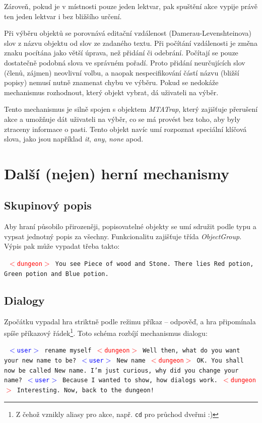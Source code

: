 \documentclass[11pt, a4paper]{article}
\def\class#1{\emph{#1}}
\newenvironment{example}%
{\smallskip\noindent\ignorespaces\obeylines\tt}%
{\smallskip\par\noindent
\ignorespacesafterend}
\def\user{\textcolor{blue}{$<$user$>$ }}
\def\dung{\textcolor{red}{$<$dungeon$>$ }}
\begin{document}
Zároveň, pokud je v místnosti pouze jeden lektvar, pak spuštění akce vypije právě ten jeden lektvar i bez bližšího určení.

Při výběru objektů se porovnává editační vzdálenost (Damerau-Levenshteinova) slov z názvu objektu od slov ze zadaného textu. Při počítání vzdálenosti je změna znaku pocítána jako větší úprava, než přidání či odebrání. Počítají se pouze dostatečně podobná slova ve správném pořadí. Proto přidání neurčujících slov (členů, zájmen) neovlivní volbu, a naopak nespecifikování částí názvu (bližší popisy) nemusí nutně znamenat chybu ve výběru. Pokud se nedokáže mechanismus rozhodnout, který objekt vybrat, dá uživateli na výběr.

Tento mechanismus je silně spojen s objektem \class{MTATrap}, který zajišťuje přerušení akce a umožňuje dát uživateli na výběr, co se má provést bez toho, aby byly ztraceny informace o pasti. Tento objekt navíc umí rozpoznat speciální klíčová slova, jako jsou například \textit{it}, \textit{any}, \textit{none} apod.

\section{Další (nejen) herní mechanismy}

\subsection{Skupinový popis}

Aby hraní působilo přirozeněji, popisovatelné objekty se umí sdružit podle typu a vypsat jednotný popis za všechny. Funkcionalitu zajišťuje třída \class{ObjectGroup}. Výpis pak může vypadat třeba takto:

\begin{example}
\dung You see Piece of wood and Stone. There lies Red potion, Green
potion and Blue potion. 
\end{example}

\subsection{Dialogy}
\label{dialogs}
Zpočátku vypadal hra striktně podle režimu příkaz -- odpověď, a hra připomínala spíše příkazový řádek\footnote{Z čehož vznikly aliasy pro akce, např. \texttt{cd} pro průchod dveřmi :)}. Toto schéma rozbíjí mechanismus dialogu:

\begin{example}
\user rename myself
\dung Well then, what do you want your new name to be?
\user New name
\dung OK. You shall now be called New name. I'm just curious, why did 
you change your name?
\user Because I wanted to show, how dialogs work.
\dung Interesting. Now, back to the dungeon!
\end{example}
\end{document}
